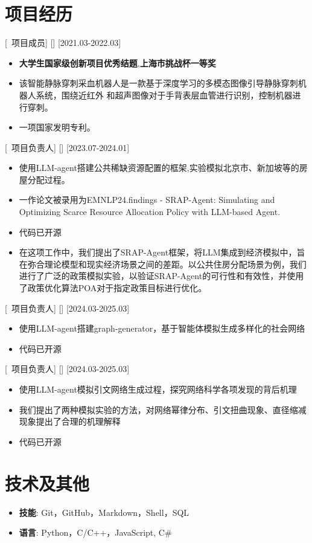 \documentclass{resume}
\begin{document}
\section{项目经历}

[\ 项目成员]
[]
[2021.03-2022.03]
\begin{itemize}
  \item \textbf{大学生国家级创新项目优秀结题},\textbf{上海市挑战杯一等奖}
  \item 该智能静脉穿刺采血机器人是一款基于深度学习的多模态图像引导静脉穿刺机器人系统，围绕近红外
  和超声图像对于手背表层血管进行识别，控制机器进行穿刺。
  \item 一项国家发明专利。
\end{itemize}

[\ 项目负责人]
[]
[2023.07-2024.01]
\begin{itemize}
  \item 使用LLM-agent搭建公共稀缺资源配置的框架,实验模拟北京市、新加坡等的房屋分配过程。
  \item 一作论文被录用为EMNLP24.findings - SRAP-Agent: Simulating and Optimizing Scarce Resource Allocation Policy with LLM-based Agent.  
  \item 代码已开源 
  \item 在这项工作中，我们提出了SRAP-Agent框架，将LLM集成到经济模拟中，旨在弥合理论模型和现实经济场景之间的差距。以公共住房分配场景为例，我们进行了广泛的政策模拟实验，以验证SRAP-Agent的可行性和有效性，并使用了政策优化算法POA对于指定政策目标进行优化。
\end{itemize}

[\ 项目负责人]
[]
[2024.03-2025.03]
\begin{itemize}
  \item 使用LLM-agent搭建graph-generator，基于智能体模拟生成多样化的社会网络
  \item 代码已开源
\end{itemize}

[\ 项目负责人]
[]
[2024.03-2025.03]
\begin{itemize}
  \item 使用LLM-agent模拟引文网络生成过程，探究网络科学各项发现的背后机理
  \item 我们提出了两种模拟实验的方法，对网络幂律分布、引文扭曲现象、直径缩减现象提出了合理的机理解释
  \item 代码已开源
\end{itemize}

\section[技术及其他]{技术及其他}
\begin{itemize}
  \item \textbf{技能}: Git，GitHub，Markdown，Shell，SQL
  \item \textbf{语言}: Python，C/C++，JavaScript, C#
\end{itemize}
\end{document}
